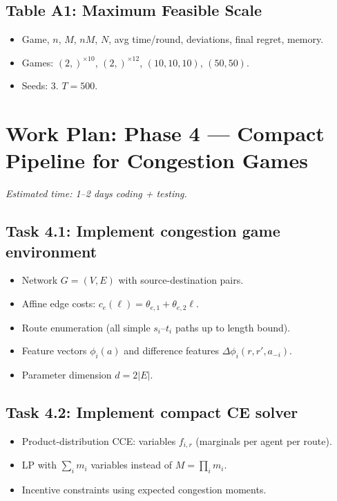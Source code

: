 \documentclass[11pt]{article}
\begin{document}
\subsection{Table A1: Maximum Feasible Scale}
\begin{itemize}[nosep]
    \item Game, $n$, $M$, $nM$, $N$, avg time/round, deviations, final regret, memory.
    \item Games: $(2,)^{\times 10}$, $(2,)^{\times 12}$, $(10,10,10)$, $(50,50)$.
    \item Seeds: 3. $T = 500$.
\end{itemize}

\section{Work Plan: Phase 4 --- Compact Pipeline for Congestion Games}

\textit{Estimated time: 1--2 days coding + testing.}

\subsection{Task 4.1: Implement congestion game environment}
\begin{itemize}[nosep]
    \item Network $G = (V, E)$ with source-destination pairs.
    \item Affine edge costs: $c_e(\ell) = \theta_{e,1} + \theta_{e,2} \ell$.
    \item Route enumeration (all simple $s_i$--$t_i$ paths up to length bound).
    \item Feature vectors $\phi_i(a)$ and difference features $\Delta\phi_i(r, r', a_{-i})$.
    \item Parameter dimension $d = 2|E|$.
\end{itemize}

\subsection{Task 4.2: Implement compact CE solver}
\begin{itemize}[nosep]
    \item Product-distribution CCE: variables $f_{i,r}$ (marginals per agent per route).
    \item LP with $\sum_i m_i$ variables instead of $M = \prod_i m_i$.
    \item Incentive constraints using expected congestion moments.
\end{itemize}
\end{document}

